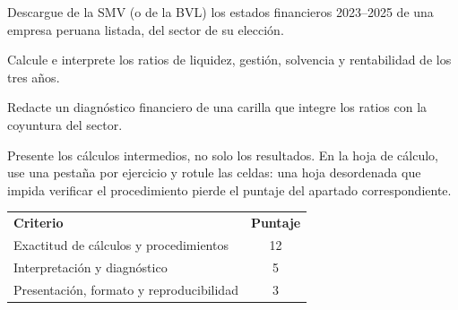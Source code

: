 \documentclass{academic-exam}
\begin{document}
\begin{ejercicio}
Descargue de la SMV (o de la BVL) los estados financieros 2023--2025 de
una empresa peruana listada, del sector de su elección.
\begin{apartados}
  \item Calcule e interprete los ratios de liquidez, gestión, solvencia y
        rentabilidad de los tres años. 
  \item Redacte un diagnóstico financiero de una carilla que integre los
        ratios con la coyuntura del sector. 
\end{apartados}
\end{ejercicio}

\begin{observacion}[Recomendaciones]
Presente los cálculos intermedios, no solo los resultados. En la hoja de
cálculo, use una pestaña por ejercicio y rotule las celdas: una hoja
desordenada que impida verificar el procedimiento pierde el puntaje del
apartado correspondiente.
\end{observacion}

\begin{criterios}
\begin{tabularx}{\linewidth}{@{}X c@{}}
  \textbf{Criterio} & \textbf{Puntaje}\\
  \arrayrulecolor{grislinea}\hline\addlinespace[3pt]
  Exactitud de cálculos y procedimientos           & 12\\
  Interpretación y diagnóstico                     & 5\\
  Presentación, formato y reproducibilidad         & 3\\
\end{tabularx}
\end{criterios}

\findelexamen
\end{document}
